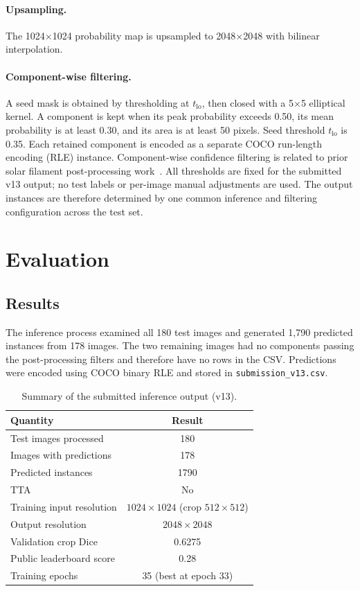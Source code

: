 \documentclass[sigconf,nonacm]{acmart}
\begin{document}
\paragraph{Upsampling.}
The 1024$\times$1024 probability map is upsampled to
2048$\times$2048 with bilinear interpolation.

\paragraph{Component-wise filtering.}
A seed mask is obtained by thresholding at $t_{\mathrm{lo}}$,
then closed with a 5$\times$5 elliptical kernel. A component is
kept when its peak probability exceeds 0.50, its mean probability
is at least 0.30, and its area is at least 50 pixels. Seed
threshold $t_{\mathrm{lo}}$ is 0.35. Each retained component is
encoded as a separate COCO run-length encoding (RLE) instance.
Component-wise confidence filtering is related to prior solar
filament post-processing work~\cite{afshar2026}.
All thresholds are fixed for the submitted v13 output; no test
labels or per-image manual adjustments are used. The output
instances are therefore determined by one common inference and
filtering configuration across the test set.


\section{Evaluation}

\subsection{Results}

The inference process examined all 180 test images and generated
1,790 predicted instances from 178 images. The two remaining
images had no components passing the post-processing filters and
therefore have no rows in the CSV. Predictions were encoded using
COCO binary RLE and stored in \texttt{submission\_v13.csv}.

\begin{table}[ht]
\centering
\caption{Summary of the submitted inference output (v13).}
\begin{tabular}{lc}
\toprule
Quantity & Result \\
\midrule
Test images processed       & 180 \\
Images with predictions     & 178 \\
Predicted instances         & 1790 \\
TTA                         & No \\
Training input resolution   & $1024\times1024$ (crop $512\times512$) \\
Output resolution           & $2048\times2048$ \\
Validation crop Dice        & 0.6275 \\
Public leaderboard score    & 0.28 \\
Training epochs             & 35 (best at epoch 33) \\
\bottomrule
\end{tabular}
\end{table}
\end{document}

